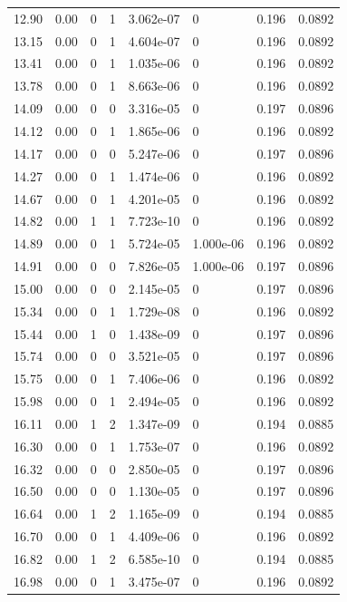 \documentclass[preview]{standalone}
\begin{document}
{{{\begin{tabular}{L{1.2cm}C{1.2cm} C{0.3cm}C{0.5cm} C{1.4cm}C{1.4cm} C{1.4cm}C{1.4cm}}
  12.90  &  0.00  & 0     &  1 &  3.062e-07  & 0  & 0.196 &  0.0892   \\ 
  13.15  &  0.00  & 0     &  1 &  4.604e-07  & 0  & 0.196 &  0.0892   \\ 
  13.41  &  0.00  & 0     &  1 &  1.035e-06  & 0  & 0.196 &  0.0892   \\ 
  13.78  &  0.00  & 0     &  1 &  8.663e-06  & 0  & 0.196 &  0.0892   \\ 
  14.09  &  0.00  & 0     &  0 &  3.316e-05  & 0  & 0.197 &  0.0896   \\ 
  14.12  &  0.00  & 0     &  1 &  1.865e-06  & 0  & 0.196 &  0.0892   \\ 
  14.17  &  0.00  & 0     &  0 &  5.247e-06  & 0  & 0.197 &  0.0896   \\ 
  14.27  &  0.00  & 0     &  1 &  1.474e-06  & 0  & 0.196 &  0.0892   \\ 
  14.67  &  0.00  & 0     &  1 &  4.201e-05  & 0  & 0.196 &  0.0892   \\ 
  14.82  &  0.00  & 1     &  1 &  7.723e-10  & 0  & 0.196 &  0.0892   \\ 
  14.89  &  0.00  & 0     &  1 &  5.724e-05  & 1.000e-06  & 0.196 &  0.0892   \\ 
  14.91  &  0.00  & 0     &  0 &  7.826e-05  & 1.000e-06  & 0.197 &  0.0896   \\ 
  15.00  &  0.00  & 0     &  0 &  2.145e-05  & 0  & 0.197 &  0.0896   \\ 
  15.34  &  0.00  & 0     &  1 &  1.729e-08  & 0  & 0.196 &  0.0892   \\ 
  15.44  &  0.00  & 1     &  0 &  1.438e-09  & 0  & 0.197 &  0.0896   \\ 
  15.74  &  0.00  & 0     &  0 &  3.521e-05  & 0  & 0.197 &  0.0896   \\ 
  15.75  &  0.00  & 0     &  1 &  7.406e-06  & 0  & 0.196 &  0.0892   \\ 
  15.98  &  0.00  & 0     &  1 &  2.494e-05  & 0  & 0.196 &  0.0892   \\ 
  16.11  &  0.00  & 1     &  2 &  1.347e-09  & 0  & 0.194 &  0.0885   \\ 
  16.30  &  0.00  & 0     &  1 &  1.753e-07  & 0  & 0.196 &  0.0892   \\ 
  16.32  &  0.00  & 0     &  0 &  2.850e-05  & 0  & 0.197 &  0.0896   \\ 
  16.50  &  0.00  & 0     &  0 &  1.130e-05  & 0  & 0.197 &  0.0896   \\ 
  16.64  &  0.00  & 1     &  2 &  1.165e-09  & 0  & 0.194 &  0.0885   \\ 
  16.70  &  0.00  & 0     &  1 &  4.409e-06  & 0  & 0.196 &  0.0892   \\ 
  16.82  &  0.00  & 1     &  2 &  6.585e-10  & 0  & 0.194 &  0.0885   \\ 
  16.98  &  0.00  & 0     &  1 &  3.475e-07  & 0  & 0.196 &  0.0892   \\ 
\hline 
\end{tabular} 

}}}
\end{document}
